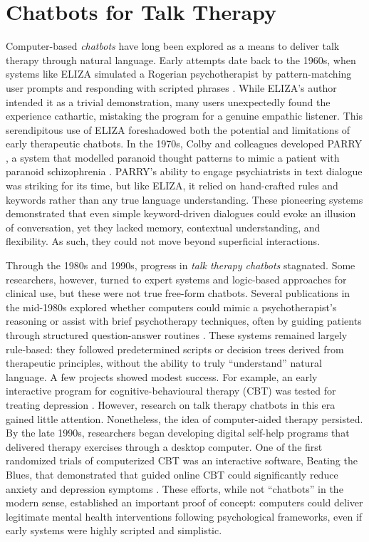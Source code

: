 \section{Chatbots for Talk Therapy}
Computer-based \emph{chatbots} have long been explored as a means to deliver talk therapy through natural language. Early attempts date back to the 1960s, when systems like ELIZA simulated a Rogerian psychotherapist by pattern-matching user prompts and responding with scripted phrases \cite{Weizenbaum1966}. While ELIZA's author intended it as a trivial demonstration, many users unexpectedly found the experience cathartic, mistaking the program for a genuine empathic listener. This serendipitous use of ELIZA foreshadowed both the potential and limitations of early therapeutic chatbots. In the 1970s, Colby and colleagues developed PARRY \cite{10.5555/212154.212175}, a system that modelled paranoid thought patterns to mimic a patient with paranoid schizophrenia \cite{Colby1971}. PARRY's ability to engage psychiatrists in text dialogue was striking for its time, but like ELIZA, it relied on hand-crafted rules and keywords rather than any true language understanding. These pioneering systems demonstrated that even simple keyword-driven dialogues could evoke an illusion of conversation, yet they lacked memory, contextual understanding, and flexibility. As such, they could not move beyond superficial interactions.


Through the 1980s and 1990s, progress in \emph{talk therapy chatbots} stagnated. Some researchers, however, turned to expert systems and logic-based approaches for clinical use, but these were not true free-form chatbots. Several publications in the mid-1980s explored whether computers could mimic a psychotherapist's reasoning or assist with brief psychotherapy techniques, often by guiding patients through structured question-answer routines \cite{Hartman1986,Sampson1986,ServanSchreiber1986}. These systems remained largely rule-based: they followed predetermined scripts or decision trees derived from therapeutic principles, without the ability to truly ``understand'' natural language. A few projects showed modest success. For example, an early interactive program for cognitive-behavioural therapy (CBT) was tested for treating depression \cite{Selmi1990}. However, research on talk therapy chatbots in this era gained little attention. Nonetheless, the idea of computer-aided therapy persisted. By the late 1990s, researchers began developing digital self-help programs that delivered therapy exercises through a desktop computer. One of the first randomized trials of computerized CBT was an interactive software, Beating the Blues, that demonstrated that guided online CBT could significantly reduce anxiety and depression symptoms \cite{Proudfoot2003}. These efforts, while not ``chatbots'' in the modern sense, established an important proof of concept: computers could deliver legitimate mental health interventions following psychological frameworks, even if early systems were highly scripted and simplistic.


